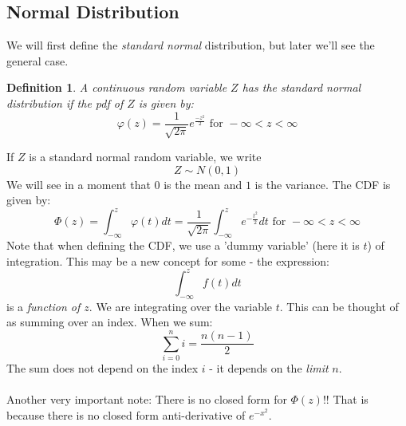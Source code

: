 \documentclass[12pt]{article} %
\newtheorem{defn}{Definition}
\begin{document}
\subsection{Normal Distribution}
We will first define the \emph{standard normal} distribution, but later we'll see the general case.
\begin{defn}
A continuous random variable $Z$ has the standard normal distribution if the pdf of $Z$ is given by:
$$\varphi(z) = \frac1{\sqrt{2\pi}} e^{\frac{-z^2}2} \textrm{ for } -\infty <z<\infty$$
\end{defn}
If $Z$ is a standard normal random variable, we write
$$Z\sim N(0,1)$$
We will see in a moment that $0$ is the mean and $1$ is the variance. The CDF is given by:
$$\Phi(z) = \int_{-\infty}^{z}\varphi(t) dt =  \frac1{\sqrt{2\pi}}\int_{-\infty}^{z} e^{-\frac{t^2}{2}} dt \textrm{ for } -\infty <z<\infty$$
Note that when defining the CDF, we use a 'dummy variable' (here it is $t$) of integration. This may be a new concept for some - the expression:
$$\int_{-\infty}^z f(t) dt$$
is a \emph{function of $z$}. We are integrating over the variable $t$. This can be thought of as summing over an index. When we sum:
$$\sum_{i=0}^n i = \frac{n(n-1)}2$$
The sum does not depend on the index $i$ - it depends on the \emph{limit} $n$.\\\\
Another very important note: There is no closed form for $\Phi(z)$!! That is because there is no closed form anti-derivative of $e^{-x^2}$.
\end{document}
